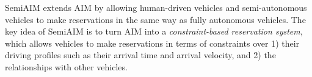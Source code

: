 
SemiAIM extends AIM by allowing human-driven vehicles and
semi-autonomous vehicles to make reservations in the same way as
fully autonomous vehicles.  The key idea of SemiAIM is to turn AIM into a
\emph{constraint-based reservation system}, which allows vehicles to
make reservations in terms of constraints over 1) their driving
profiles such as their arrival time and arrival velocity, and 2) the
relationships with other vehicles.
